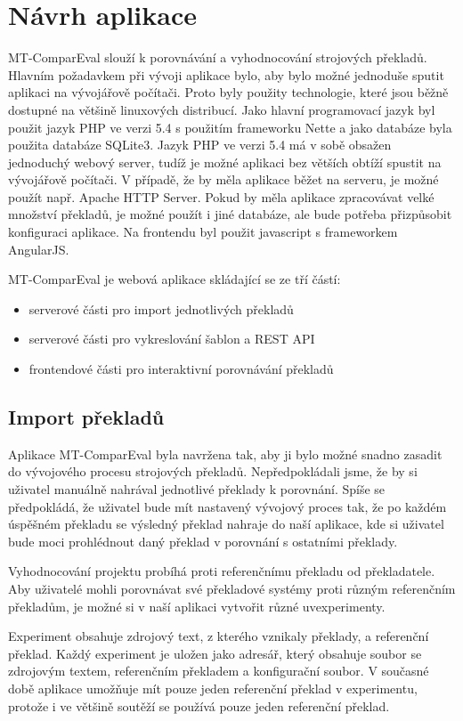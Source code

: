 \chapter{Návrh aplikace}
MT-ComparEval slouží k porovnávání a vyhodnocování strojových překladů.
Hlavním požadavkem při vývoji aplikace bylo,
  aby bylo možné jednoduše sputit aplikaci na vývojářově počítači.
Proto byly použity technologie,
  které jsou běžně dostupné na většině linuxových distribucí.
Jako hlavní programovací jazyk byl použit jazyk PHP ve verzi 5.4 
  s použitím frameworku Nette
  a jako databáze byla použita databáze SQLite3.
Jazyk PHP ve verzi 5.4 má v sobě obsažen jednoduchý webový server,
  tudíž je možné aplikaci bez větších obtíží spustit na vývojářově počítači.
V případě, že by měla aplikace běžet na serveru,
  je možné použít např. Apache HTTP Server.
Pokud by měla aplikace zpracovávat velké množství překladů,
  je možné použít i jiné databáze,
  ale bude potřeba přizpůsobit konfiguraci aplikace.
Na frontendu byl použit javascript s frameworkem AngularJS.


MT-ComparEval je webová aplikace skládající se ze tří částí:

\begin{itemize}
	\item serverové části pro import jednotlivých překladů
	\item serverové části pro vykreslování šablon a REST API
	\item frontendové části pro interaktivní porovnávání překladů
\end{itemize}

\section{Import překladů}
Aplikace MT-ComparEval byla navržena tak,
  aby ji bylo možné snadno zasadit do vývojového procesu strojových překladů.
Nepředpokládali jsme,
  že by si uživatel manuálně nahrával jednotlivé překlady k porovnání.
Spíše se předpokládá, že uživatel bude mít nastavený vývojový proces tak,
  že po každém úspěšném překladu se výsledný překlad nahraje do naší aplikace,
  kde si uživatel bude moci prohlédnout daný překlad v porovnání s ostatními překlady.

Vyhodnocování projektu probíhá proti referenčnímu překladu od překladatele.
Aby uživatelé mohli porovnávat své překladové systémy proti různým referenčním překladům,
  je možné si v naší aplikaci vytvořit různé uv{experimenty}. 

Experiment obsahuje zdrojový text, z kterého vznikaly překlady, a referenční překlad.
Každý experiment je uložen jako adresář,
  který obsahuje soubor se zdrojovým textem, referenčním překladem
  a konfigurační soubor.
V současné době aplikace umožňuje mít pouze jeden referenční překlad v experimentu,
  protože i ve většině soutěží se používá pouze jeden referenční překlad.

